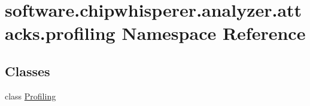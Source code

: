 \hypertarget{namespacesoftware_1_1chipwhisperer_1_1analyzer_1_1attacks_1_1profiling}{}\section{software.\+chipwhisperer.\+analyzer.\+attacks.\+profiling Namespace Reference}
\label{namespacesoftware_1_1chipwhisperer_1_1analyzer_1_1attacks_1_1profiling}
\subsection*{Classes}
\begin{DoxyCompactItemize}
\item 
class \hyperlink{classsoftware_1_1chipwhisperer_1_1analyzer_1_1attacks_1_1profiling_1_1Profiling}{Profiling}
\end{DoxyCompactItemize}
